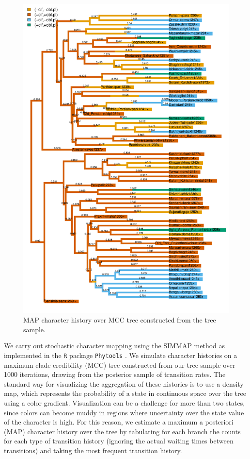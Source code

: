 \documentclass[11pt]{article}
\begin{document}
\begin{figure}[h!]
\centering
\includegraphics[width=.7\linewidth]{code/consensus_simmap.pdf}
\caption{MAP character history over MCC tree constructed from the tree sample.}
\label{MAP}
\end{figure}

We carry out stochastic character mapping using the SIMMAP method \citep{Bollback2006} as implemented in the {\tt R} package {\tt Phytools} \citep{Revell2012}. We simulate character histories on a maximum clade credibility (MCC) tree constructed from our tree sample over 1000 iterations, drawing from the posterior sample of transition rates. 
The standard way for visualizing the aggregation of these histories is to use a density map, which represents the probability of a state in continuous space over the tree using a color gradient. Visualization can be a challenge for more than two states, since colors can become muddy in regions where uncertainty over the state value of the character is high. For this reason, we estimate a maximum a posteriori (MAP) character history over the tree by tabulating for each branch the counts for each type of transition history (ignoring the actual waiting times between transitions)
and taking the most frequent transition history. 
\end{document}
